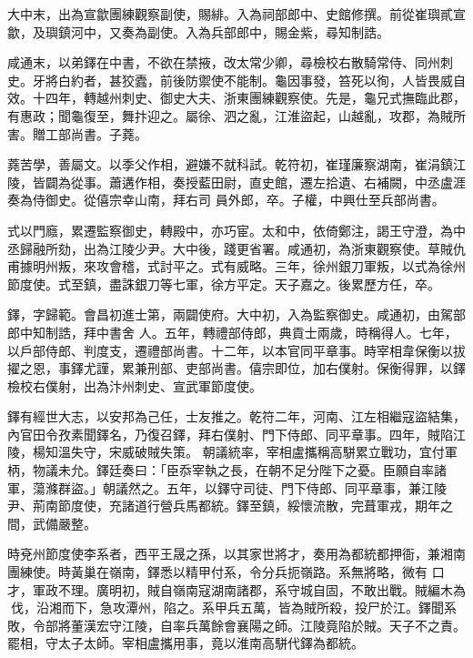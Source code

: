 \begin{pinyinscope}
 大中末，出為宣歙團練觀察副使，賜緋。入為祠部郎中、史館修撰。前從崔璵貳宣歙，及璵鎮河中，又奏為副使。入為兵部郎中，賜金紫，尋知制誥。



 咸通末，以弟鐸在中書，不欲在禁掖，改太常少卿，尋檢校右散騎常侍、同州刺
 史。牙將白約者，甚狡蠹，前後防禦使不能制。龜因事發，笞死以徇，人皆畏威自效。十四年，轉越州刺史、御史大夫、浙東團練觀察使。先是，龜兄式撫臨此郡，有惠政；聞龜復至，舞抃迎之。屬徐、泗之亂，江淮盜起，山越亂，攻郡，為賊所害。贈工部尚書。子蕘。



 蕘苦學，善屬文。以季父作相，避嫌不就科試。乾符初，崔瑾廉察湖南，崔涓鎮江陵，皆闢為從事。蕭遘作相，奏授藍田尉，直史館，遷左拾遺、右補闕，中丞盧涯奏為侍御史。從僖宗幸山南，拜右司
 員外郎，卒。子權，中興仕至兵部尚書。



 式以門廕，累遷監察御史，轉殿中，亦巧宦。太和中，依倚鄭注，謁王守澄，為中丞歸融所劾，出為江陵少尹。大中後，踐更省署。咸通初，為浙東觀察使。草賊仇甫據明州叛，來攻會稽，式討平之。式有威略。三年，徐州銀刀軍叛，以式為徐州節度使。式至鎮，盡誅銀刀等七軍，徐方平定。天子嘉之。後累歷方任，卒。



 鐸，字歸範。會昌初進士第，兩闢使府。大中初，入為監察御史。咸通初，由駕部郎中知制誥，拜中書舍
 人。五年，轉禮部侍郎，典貢士兩歲，時稱得人。七年，以戶部侍郎、判度支，遷禮部尚書。十二年，以本官同平章事。時宰相韋保衡以拔擢之恩，事鐸尤謹，累兼刑部、吏部尚書。僖宗即位，加右僕射。保衡得罪，以鐸檢校右僕射，出為汴州刺史、宣武軍節度使。



 鐸有經世大志，以安邦為己任，士友推之。乾符二年，河南、江左相繼寇盜結集，內官田令孜素聞鐸名，乃復召鐸，拜右僕射、門下侍郎、同平章事。四年，賊陷江陵，楊知溫失守，宋威破賊失策。
 朝議統率，宰相盧攜稱高駢累立戰功，宜付軍柄，物議未允。鐸廷奏曰：「臣忝宰執之長，在朝不足分陛下之憂。臣願自率諸軍，蕩滌群盜。」朝議然之。五年，以鐸守司徒、門下侍郎、同平章事，兼江陵尹、荊南節度使，充諸道行營兵馬都統。鐸至鎮，綏懷流散，完葺軍戎，期年之間，武備嚴整。



 時兗州節度使李系者，西平王晟之孫，以其家世將才，奏用為都統都押衙，兼湘南團練使。時黃巢在嶺南，鐸悉以精甲付系，令分兵扼嶺路。系無將略，微有
 口才，軍政不理。廣明初，賊自嶺南寇湖南諸郡，系守城自固，不敢出戰。賊編木為伐，沿湘而下，急攻潭州，陷之。系甲兵五萬，皆為賊所殺，投尸於江。鐸聞系敗，令部將董漢宏守江陵，自率兵萬餘會襄陽之師。江陵竟陷於賊。天子不之責。罷相，守太子太師。宰相盧攜用事，竟以淮南高駢代鐸為都統。




\end{pinyinscope}
